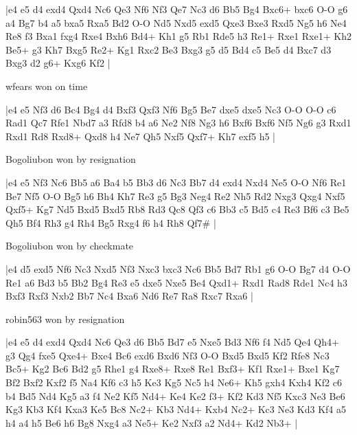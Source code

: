 \makegametitle
|e4 e5 d4 exd4 Qxd4 Nc6 Qe3 Nf6 Nf3 Qe7 Nc3 d6 Bb5 Bg4 Bxc6+ bxc6 O-O g6 a4 Bg7 b4 a5 bxa5 Rxa5 Bd2 O-O Nd5 Nxd5 exd5 Qxe3 Bxe3 Rxd5 Ng5 h6 Ne4 Re8 f3 Bxa1 fxg4 Rxe4 Bxh6 Bd4+ Kh1 g5 Rb1 Rde5 h3 Re1+ Rxe1 Rxe1+ Kh2 Be5+ g3 Kh7 Bxg5 Re2+ Kg1 Rxc2 Be3 Bxg3 g5 d5 Bd4 c5 Be5 d4 Bxc7 d3 Bxg3 d2 g6+ Kxg6 Kf2  |

\showboard

wfears won on time

\makegametitle
|e4 e5 Nf3 d6 Bc4 Bg4 d4 Bxf3 Qxf3 Nf6 Bg5 Be7 dxe5 dxe5 Nc3 O-O O-O c6 Rad1 Qc7 Rfe1 Nbd7 a3 Rfd8 b4 a6 Ne2 Nf8 Ng3 h6 Bxf6 Bxf6 Nf5 Ng6 g3 Rxd1 Rxd1 Rd8 Rxd8+ Qxd8 h4 Ne7 Qh5 Nxf5 Qxf7+ Kh7 exf5 h5  |

\showboard

Bogoliubon won by resignation

\makegametitle
|e4 e5 Nf3 Nc6 Bb5 a6 Ba4 b5 Bb3 d6 Nc3 Bb7 d4 exd4 Nxd4 Ne5 O-O Nf6 Re1 Be7 Nf5 O-O Bg5 h6 Bh4 Kh7 Re3 g5 Bg3 Neg4 Re2 Nh5 Rd2 Nxg3 Qxg4 Nxf5 Qxf5+ Kg7 Nd5 Bxd5 Bxd5 Rb8 Rd3 Qc8 Qf3 c6 Bb3 c5 Bd5 c4 Re3 Bf6 c3 Be5 Qh5 Bf4 Rh3 g4 Rh4 Bg5 Rxg4 f6 h4 Rh8 Qf7\#  |

\showboard

Bogoliubon won by checkmate

\makegametitle
|e4 d5 exd5 Nf6 Nc3 Nxd5 Nf3 Nxc3 bxc3 Nc6 Bb5 Bd7 Rb1 g6 O-O Bg7 d4 O-O Re1 a6 Bd3 b5 Bb2 Bg4 Re3 e5 dxe5 Nxe5 Be4 Qxd1+ Rxd1 Rad8 Rde1 Nc4 h3 Bxf3 Rxf3 Nxb2 Bb7 Nc4 Bxa6 Nd6 Re7 Ra8 Rxc7 Rxa6  |

\showboard

robin563 won by resignation

\makegametitle
|e4 e5 d4 exd4 Qxd4 Nc6 Qe3 d6 Bb5 Bd7 e5 Nxe5 Bd3 Nf6 f4 Nd5 Qe4 Qh4+ g3 Qg4 fxe5 Qxe4+ Bxe4 Bc6 exd6 Bxd6 Nf3 O-O Bxd5 Bxd5 Kf2 Rfe8 Nc3 Bc5+ Kg2 Bc6 Bd2 g5 Rhe1 g4 Rxe8+ Rxe8 Re1 Bxf3+ Kf1 Rxe1+ Bxe1 Kg7 Bf2 Bxf2 Kxf2 f5 Na4 Kf6 c3 h5 Ke3 Kg5 Nc5 h4 Ne6+ Kh5 gxh4 Kxh4 Kf2 c6 b4 Bd5 Nd4 Kg5 a3 f4 Ne2 Kf5 Nd4+ Ke4 Ke2 f3+ Kf2 Kd3 Nf5 Kxc3 Ne3 Be6 Kg3 Kb3 Kf4 Kxa3 Ke5 Bc8 Nc2+ Kb3 Nd4+ Kxb4 Nc2+ Kc3 Ne3 Kd3 Kf4 a5 h4 a4 h5 Be6 h6 Bg8 Nxg4 a3 Ne5+ Ke2 Nxf3 a2 Nd4+ Kd2 Nb3+  |

